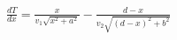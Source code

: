 \documentclass[preview]{standalone}
\begin{document}
\begin{align*}
\frac{dT}{dx} = \frac{x}{v_1\sqrt{x^2+a^2}} - \frac{d-x}{v_2\sqrt{(d-x)^2+b^2}}
\end{align*}
\end{document}
